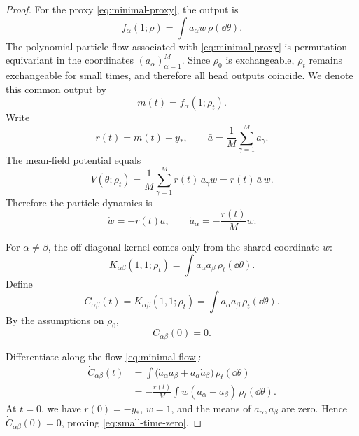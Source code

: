 \begin{proof}
For the proxy \eqref{eq:minimal-proxy}, the output is
\[
  f_\alpha(1;\rho)=\int a_\alpha w\,\rho(\dd \theta).
\]
The polynomial particle flow associated with \eqref{eq:minimal-proxy} is permutation-equivariant in the coordinates $(a_\alpha)_{\alpha=1}^M$.
Since $\rho_0$ is exchangeable, $\rho_t$ remains exchangeable for small times, and therefore all head outputs coincide.
We denote this common output by
\[
  m(t)=f_\alpha(1;\rho_t).
\]
Write
\[
  r(t)=m(t)-y_*,
  \qquad
  \bar a=\frac1M \sum_{\gamma=1}^M a_\gamma.
\]
The mean-field potential equals
\[
  V(\theta;\rho_t)
  =
  \frac1M \sum_{\gamma=1}^M r(t)\,a_\gamma w
  =
  r(t)\,\bar a\,w.
\]
Therefore the particle dynamics is
\begin{equation}
  \dot w = -r(t)\bar a,
  \qquad
  \dot a_\alpha = -\frac{r(t)}{M}w.
  \label{eq:minimal-flow}
\end{equation}

For $\alpha\neq\beta$, the off-diagonal kernel comes only from the shared coordinate $w$:
\[
  K_{\alpha\beta}(1,1;\rho_t)
  =
  \int a_\alpha a_\beta\,\rho_t(\dd \theta).
\]
Define
\[
  C_{\alpha\beta}(t)=K_{\alpha\beta}(1,1;\rho_t)=\int a_\alpha a_\beta\,\rho_t(\dd \theta).
\]
By the assumptions on $\rho_0$,
\[
  C_{\alpha\beta}(0)=0.
\]

Differentiate along the flow \eqref{eq:minimal-flow}:
\begin{align}
  \dot C_{\alpha\beta}(t)
  &=
  \int \bigl(\dot a_\alpha a_\beta + a_\alpha \dot a_\beta\bigr)\,\rho_t(\dd \theta)
  \nonumber\\
  &=
  -\frac{r(t)}{M}
  \int w(a_\alpha+a_\beta)\,\rho_t(\dd \theta).
  \label{eq:first-C}
\end{align}
At $t=0$, we have $r(0)=-y_*$, $w=1$, and the means of $a_\alpha,a_\beta$ are zero.
Hence $\dot C_{\alpha\beta}(0)=0$, proving \eqref{eq:small-time-zero}.


\end{proof}
